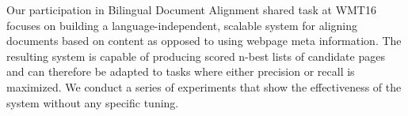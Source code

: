 Our participation in Bilingual Document Alignment shared task at WMT16 focuses on building a language-independent, scalable system for aligning documents based on content as opposed to using webpage meta information. The resulting system is capable of producing scored n-best lists of candidate pages and can therefore be adapted to tasks where either precision or recall is maximized. We conduct a series of experiments that show the effectiveness of the system without any specific tuning.
